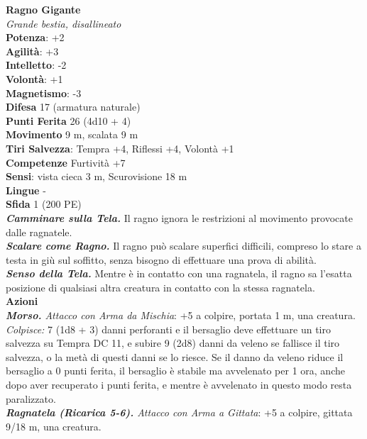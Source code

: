 \begin{multicols}{2}
\medskip\textbf{Ragno Gigante}\\
\emph{Grande bestia, disallineato}\\
\textbf{Potenza}: +2\\
\textbf{Agilità}: +3\\
\textbf{Intelletto}: -2\\
\textbf{Volontà}: +1\\
\textbf{Magnetismo}: -3\\
\textbf{Difesa} 17 (armatura naturale)\\
\textbf{Punti Ferita} 26 (4d10 + 4)\\
\textbf{Movimento} 9 m, scalata 9 m\\
\textbf{Tiri Salvezza}:  Tempra +4, Riflessi +4, Volontà +1 \\
\textbf{Competenze} Furtività +7\\
\textbf{Sensi}: vista cieca 3 m, Scurovisione 18 m\\
\textbf{Lingue} -\\
\textbf{Sfida} 1 (200 PE)\smallskip\\
\emph{\textbf{Camminare sulla Tela.}} Il ragno ignora le restrizioni al movimento provocate dalle ragnatele.\\
\emph{\textbf{Scalare come Ragno.}} Il ragno può scalare superfici difficili, compreso lo stare a testa in giù sul soffitto, senza bisogno di effettuare una prova di abilità.\\
\emph{\textbf{Senso della Tela.}} Mentre è in contatto con una ragnatela, il ragno sa l'esatta posizione di qualsiasi altra creatura in contatto con la stessa ragnatela.\\
\smallskip\textbf{Azioni}\\
\emph{\textbf{Morso.} Attacco con Arma da Mischia}: +5 a colpire, portata 1 m, una creatura.\\
\emph{Colpisce:} 7 (1d8 + 3) danni perforanti e il bersaglio deve effettuare un tiro salvezza su Tempra DC 11, e subire 9 (2d8) danni da veleno se fallisce il tiro salvezza, o la metà di questi danni se lo riesce. Se il danno da veleno riduce il bersaglio a 0 punti ferita, il bersaglio è stabile ma avvelenato per 1 ora, anche dopo aver recuperato i punti ferita, e mentre è avvelenato in questo modo resta paralizzato.\\

\emph{\textbf{Ragnatela (Ricarica 5-6).} Attacco con Arma a Gittata}: +5 a colpire, gittata 9/18 m, una creatura.\\


\end{multicols}
